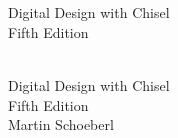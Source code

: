 \documentclass[%
    10pt,
    headinclude, footexclude,
    openright, %
    notitlepage,
    cleardoubleempty,
    headsepline,
    pointlessnumbers,
    bibtotoc, idxtotoc,
    ]{scrbook}
\newif\ifbook
\begin{document}
\ifbook
\else

\newpage
\thispagestyle{empty}
~
\newpage
\fi



\begin{flushleft}
\pagestyle{empty}
\ \\
\vspace{1cm}
{\mdseries\huge Digital Design with Chisel}
\ \\
\vspace{1cm}
{\mdseries\Large Fifth Edition}
\cleardoublepage
\end{flushleft}
\newpage


\begin{flushleft}
\pagestyle{empty}
\ \\
\vspace{1cm}
{\Huge Digital Design with Chisel\\
\bigskip
{\huge Fifth Edition}\\
\bigskip
\bigskip
\bigskip
\bigskip
\bigskip
{\huge Martin Schoeberl}
\medskip\\

}

\newpage
\end{flushleft}
\end{document}
